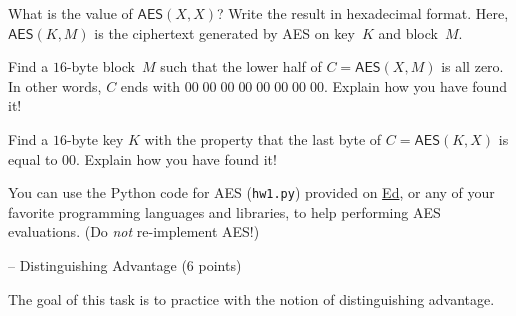 \documentclass{homework}
\def\AES{{\mathsf{AES}}}
\begin{document}
\begin{subtasks}
\item{}
What is the value of $\AES(X, X)$?
Write the result in hexadecimal format.
Here, $\AES(K, M)$ is the ciphertext generated by AES on key~$K$ and block~$M$.
\item{}
Find a $16$-byte block~$M$
such that the lower half of ${C = \AES(X, M)}$ is all zero.
In other words, $C$ ends with $00\; 00\; 00\; 00\; 00\; 00\; 00\; 00$.
Explain how you have found it! 
\item{} Find a $16$-byte key $K$ with the property that the last
byte of $C = \AES(K, X)$ is equal to $00$.
Explain how you have found it!
\end{subtasks}
You can use the Python code for AES (\texttt{hw1.py}) provided on
\href{https://edstem.org/us/courses/47519/resources}{Ed},
or any of your favorite programming languages and libraries,
to help performing AES evaluations.  (Do {\em not} re-implement AES!)

 -- Distinguishing Advantage (6 points)

The goal of this task is to practice with the notion of distinguishing
advantage.
%
\smallskip
\end{document}
